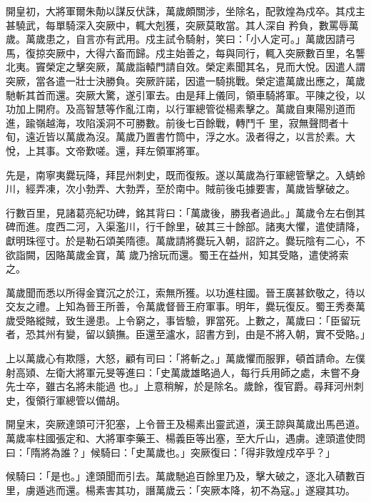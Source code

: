 \begin{pinyinscope}
 開皇初，大將軍爾朱勣以謀反伏誅，萬歲頗關涉，坐除名，配敦煌為戍卒。其戍主甚驍武，每單騎深入突厥中，輒大剋獲，突厥莫敢當。其人深自
 矜負，數罵辱萬歲。萬歲患之，自言亦有武用。戍主試令騎射，笑曰：「小人定可。」萬歲因請弓馬，復掠突厥中，大得六畜而歸。戍主始善之，每與同行，輒入突厥數百里，名讋北夷。竇榮定之擊突厥，萬歲詣轅門請自效。榮定素聞其名，見而大悅。因遣人謂突厥，當各遣一壯士決勝負。突厥許諾，因遣一騎挑戰。榮定遣萬歲出應之，萬歲馳斬其首而還。突厥大驚，遂引軍去。由是拜上儀同，領車騎將軍。平陳之役，以功加上開府。及高智慧等作亂江南，以行軍總管從楊素擊之。萬歲自東陽別道而進，踰嶺越海，攻陷溪洞不可勝數。前後七百餘戰，轉鬥千
 里，寂無聲問者十旬，遠近皆以萬歲為沒。萬歲乃置書竹筒中，浮之水。汲者得之，以言於素。大悅，上其事。文帝歎嗟。還，拜左領軍將軍。



 先是，南寧夷爨玩降，拜昆州刺史，既而復叛。遂以萬歲為行軍總管擊之。入蜻蛉川，經弄凍，次小勃弄、大勃弄，至於南中。賊前後屯據要害，萬歲皆擊破之。



 行數百里，見諸葛亮紀功碑，銘其背曰：「萬歲後，勝我者過此。」萬歲令左右倒其碑而進。度西二河，入渠濫川，行千餘里，破其三十餘部。諸夷大懼，遣使請降，獻明珠徑寸。於是勒石頌美隋德。萬歲請將爨玩入朝，詔許之。爨玩陰有二心，不欲詣闕，因賂萬歲金寶，萬
 歲乃捨玩而還。蜀王在益州，知其受賂，遣使將索之。



 萬歲聞而悉以所得金寶沉之於江，索無所獲。以功進柱國。晉王廣甚欽敬之，待以交友之禮。上知為晉王所善，令萬歲督晉王府軍事。明年，爨玩復反。蜀王秀奏萬歲受賂縱賊，致生邊患。上令窮之，事皆驗，罪當死。上數之，萬歲曰：「臣留玩者，恐其州有變，留以鎮撫。臣還至瀘水，詔書方到，由是不將入朝，實不受賂。」



 上以萬歲心有欺隱，大怒，顧有司曰：「將斬之。」萬歲懼而服罪，頓首請命。左僕射高熲、左衛大將軍元旻等進曰：「史萬歲雄略過人，每行兵用師之處，未嘗不身先士卒，雖古名將未能過
 也。」上意稍解，於是除名。歲餘，復官爵。尋拜河州刺史，復領行軍總管以備胡。



 開皇末，突厥達頭可汗犯塞，上令晉王及楊素出靈武道，漢王諒與萬歲出馬邑道。萬歲率柱國張定和、大將軍李藥王、楊義臣等出塞，至大斤山，遇虜。達頭遣使問曰：「隋將為誰？」候騎曰：「史萬歲也。」突厥復曰：「得非敦煌戍卒乎？」



 候騎曰：「是也。」達頭聞而引去。萬歲馳追百餘里乃及，擊大破之，逐北入磧數百里，虜遁逃而還。楊素害其功，譖萬歲云：「突厥本降，初不為寇。」遂寢其功。




\end{pinyinscope}

